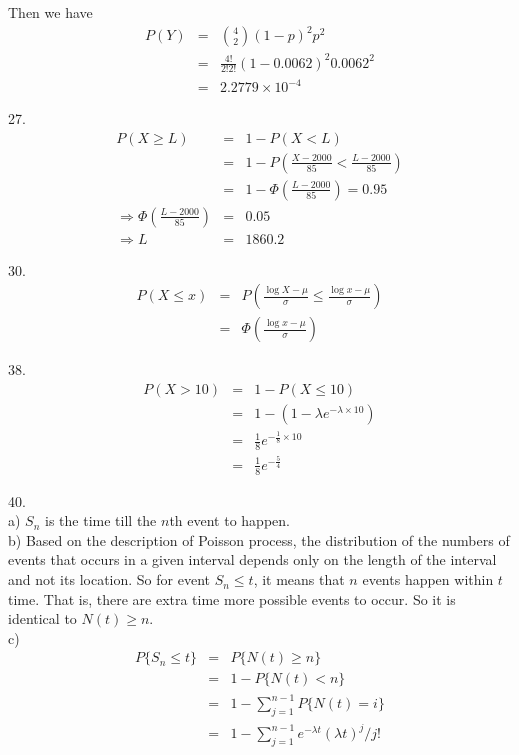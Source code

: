 \documentclass[12pt]{article}
\begin{document}
Then we have
\begin{eqnarray*}
  P(Y)
  &=& \binom {4}{2} (1-p)^2 p^2 \\
  &=& \frac {4!}{2!2!} (1-0.0062)^2 0.0062^2 \\
  &=& 2.2779 \times 10^{-4}
\end{eqnarray*}

27.
\begin{eqnarray*}
  P(X \ge L)
  &=& 1 - P(X < L) \\
  &=& 1 - P(\frac {X - 2000}{85} < \frac {L-2000}{85}) \\
  &=& 1 - \Phi(\frac {L-2000}{85}) = 0.95 \\
  \Rightarrow \Phi(\frac {L-2000}{85}) &=& 0.05 \\
  \Rightarrow L &=& 1860.2
\end{eqnarray*}

30.
\begin{eqnarray*}
  P(X \le x)
  &=& P(\frac {\log X - \mu}{\sigma} \le \frac {\log x - \mu}{\sigma}) \\
  &=& \Phi (\frac {\log x - \mu}{\sigma})
\end{eqnarray*}

38.
\begin{eqnarray*}
  P(X > 10)
  &=& 1 - P(X \le 10) \\
  &=& 1 - (1 - \lambda e^{-\lambda \times 10}) \\
  &=& \frac {1}{8} e^{-\frac {1}{8} \times 10} \\
  &=& \frac {1}{8} e^{-\frac {5}{4}}
\end{eqnarray*}

40. \\
a) $S_n$ is the time till the $n$th event to happen. \\

b) Based on the description of Poisson process, the distribution of the numbers of events that occurs in a given interval depends only on the length of the interval and not its location. So for event {$S_n \le t$}, it means that $n$ events happen within $t$ time. That is, there are extra time more possible events to occur. So it is identical to {$N(t) \ge n$}. \\

c)
\begin{eqnarray*}
  P \{ S_n \le t \}
  &=& P \{ N(t) \ge n \} \\
  &=& 1 - P \{ N(t) < n \} \\
  &=& 1 - \sum_{j=1}^{n-1} P \{ N(t) = i \} \\
  &=& 1 - \sum_{j=1}^{n-1} e^{- \lambda t} (\lambda t)^j / j!
\end{eqnarray*}
\end{document}
